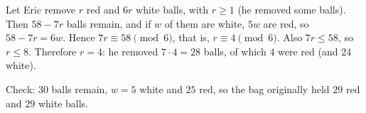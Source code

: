 Let Eric remove $r$ red and $6r$ white balls, with $r\ge1$ (he removed some balls). Then $58-7r$ balls remain, and if $w$ of them are white, $5w$ are red, so $58-7r=6w$. Hence $7r\equiv58\pmod6$, that is, $r\equiv4\pmod6$. Also $7r\le58$, so $r\le8$. Therefore $r=4$: he removed $7\cdot4=\boxed{28}$ balls, of which $\boxed{4}$ were red (and $24$ white).

Check: $30$ balls remain, $w=5$ white and $25$ red, so the bag originally held $29$ red and $29$ white balls.
